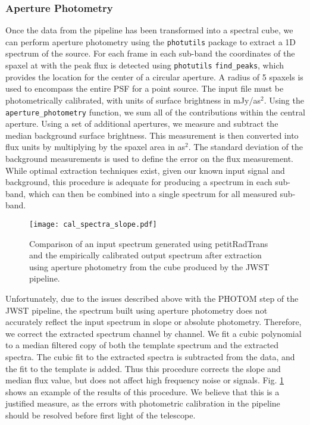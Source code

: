 \subsubsection{Aperture Photometry}

Once the data from the pipeline has been transformed into a spectral cube, we can perform aperture photometry using the \verb|photutils| package to extract a 1D spectrum of the source.
For each frame in each sub-band the coordinates of the spaxel at with the peak flux is detected using \verb|photutils| \verb|find_peaks|, which provides the location for the center of a circular aperture.
A radius of 5 spaxels is used to encompass the entire PSF for a point source.
The input file must be photometrically calibrated, with units of surface brightness in mJy/as$^{2}$.
Using the \verb|aperture_photometry| function, we sum all of the contributions within the central aperture.
Using a set of additional apertures, we measure and subtract the median background surface brightness.
This measurement is then converted into flux units by multiplying by the spaxel area in as$^{2}$.
The standard deviation of the background measurements is used to define the error on the flux measurement.
While optimal extraction techniques exist, given our known input signal and background, this procedure is adequate for producing a spectrum in each sub-band, which can then be combined into a single spectrum for all measured sub-band.
\begin{figure}[t]
	\texttt{[image: cal\_spectra\_slope.pdf]}
	\caption{Comparison of an input spectrum generated using petitRadTrans and the empirically calibrated output spectrum after extraction using aperture photometry from the cube produced by the JWST pipeline.}
	\label{fig:cal}
\end{figure}

Unfortunately, due to the issues described above with the PHOTOM step of the JWST pipeline, the spectrum built using aperture photometry does not accurately reflect the input spectrum in slope or absolute photometry. 
Therefore, we correct the extracted spectrum channel by channel. 
We fit a cubic polynomial to a median filtered copy of both the template spectrum and the extracted spectra.
The cubic fit to the extracted spectra is subtracted from the data, and the fit to the template is added. 
Thus this procedure corrects the slope and median flux value, but does not affect high frequency noise or signals.
Fig. \ref{fig:cal} shows an example of the results of this procedure. 
We believe that this is a justified measure, as the errors with photometric calibration in the pipeline should be resolved before first light of the telescope.


